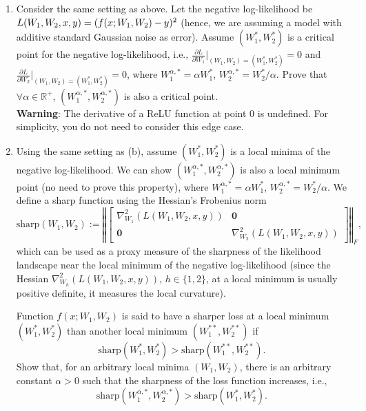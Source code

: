 \begin{enumerate}
\begin{enumerate}
    \item  
  Consider the same setting as above. Let the negative log-likelihood be $L(W_1, W_2, x, y) = (f(x; \\W_1,W_2) - y)^2$ (hence, we are assuming a model with additive standard Gaussian noise as error). Assume $(W^*_1,W^*_2)$ is a critical point for the negative log-likelihood, i.e., $\frac{\partial L}{\partial W_1}|_{(W_1,W_2) = (W^*_1,W^*_2)}=0$ and $\frac{\partial L}{\partial W_2}|_{(W_1,W_2) = (W^*_1,W^*_2)}=0$, where $W^{\alpha,*}_1=\alpha W^*_1$, $W^{\alpha,*}_2=W^*_2/\alpha$. Prove that $\forall \alpha \in \mathbb{R}^+$, $(W^{\alpha,*}_1, W^{\alpha,*}_2)$ is also a critical point. \\
  \textbf{Warning}: The derivative of a ReLU function at point $0$ is undefined. For simplicity, you do not need to consider this edge case.
  
    \newpage
    
    \item 
    Using the same setting as (b), assume $(W_1^*,W_2^*)$ is a local minima of the negative log-likelihood. We can show $(W_1^{\alpha,*},W_2^{\alpha,*})$ is also a local minimum point (no need to prove this property), where $W^{\alpha,*}_1=\alpha W^*_1$, $W^{\alpha,*}_2=W^*_2/\alpha$. We define a sharp function using the Hessian's Frobenius norm $$\text{sharp}(W_1,W_2) := \left\Vert \begin{bmatrix} \nabla^2_{W_1}(L(W_1,W_2,x,y))  & \mathbf{0}\\
    \mathbf{0} & \nabla^2_{W_2}(L(W_1,W_2,x,y))
    \end{bmatrix}\right\Vert_F,$$ which can be used as a proxy measure of the sharpness of the likelihood landscape near the local minimum of the negative log-likelihood (since the Hessian $\nabla^2_{W_h}(L(W_1,W_2,x,y))$, $h \in \{1,2\}$, at a local minimum is usually positive definite, it measures the local curvature).

    Function $f(x;W_1,W_2)$ is said to have a sharper loss at a local minimum $(W_1^*,W_2^*)$ than another local minimum $(W_1^{**},W_2^{**})$ if 
    $$\text{sharp}(W^*_1,W^*_2) > \text{sharp}(W^{**}_1,W^{**}_2).$$
    Show that, for an arbitrary local minima $(W_1,W_2)$, there is an arbitrary constant $\alpha > 0$ such that the sharpness of the loss function increases, i.e., $$\text{sharp}(W^{\alpha,*}_1,W^{\alpha,*}_2) > \text{sharp}(W^{*}_1,W^{*}_2).$$


\end{enumerate}
\end{enumerate}
